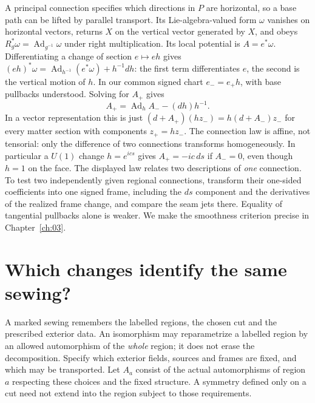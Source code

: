 A principal connection specifies which directions in $P$ are horizontal, so a base path can be lifted by parallel transport. Its Lie-algebra-valued form $\omega$ vanishes on horizontal vectors, returns $X$ on the vertical vector generated by $X$, and obeys $R_g^*\omega=\operatorname{Ad}_{g^{-1}}\omega$ under right multiplication. Its local potential is $A=e^*\omega$. Differentiating a change of section $e\mapsto eh$ gives $(eh)^*\omega=\operatorname{Ad}_{h^{-1}}(e^*\omega)+h^{-1}dh$: the first term differentiates $e$, the second is the vertical motion of $h$. In our common signed chart $e_-=e_+h$, with base pullbacks understood. Solving for $A_+$ gives
\[
 A_+=\operatorname{Ad}_h A_--(dh)h^{-1} .
\]
In a vector representation this is just $(d+A_+)(h z_-)=h(d+A_-)z_-$ for every matter section with components $z_+=h z_-$. The connection law is affine, not tensorial: only the difference of two connections transforms homogeneously. In particular a $U(1)$ change $h=e^{i c s}$ gives $A_+=-i c\,ds$ if $A_-=0$, even though $h=1$ on the face. The displayed law relates two descriptions of \emph{one} connection. To test two independently given regional connections, transform their one-sided coefficients into one signed frame, including the $ds$ component and the derivatives of the realized frame change, and compare the seam jets there. Equality of tangential pullbacks alone is weaker. We make the smoothness criterion precise in Chapter~\ref{ch:03}.

\section{Which changes identify the same sewing?}

A marked sewing remembers the labelled regions, the chosen cut and the prescribed exterior data. An isomorphism may reparametrize a labelled region by an allowed automorphism of the \emph{whole} region; it does not erase the decomposition. Specify which exterior fields, sources and frames are fixed, and which may be transported. Let $A_a$ consist of the actual automorphisms of region $a$ respecting these choices and the fixed structure. A symmetry defined only on a cut need not extend into the region subject to those requirements.

